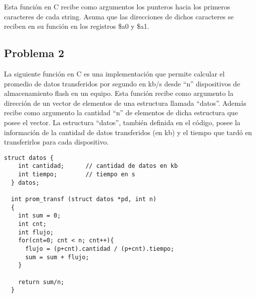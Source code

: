 \documentclass[letterpaper,11pt,notitlepage]{article}
\begin{document}
Esta función en C recibe como argumentos los punteros hacia los primeros caracteres de cada string. Asuma que las direcciones de dichos caracteres se reciben en su función en los registros \$a0 y \$a1.

%

\subsection*{Problema 2}

La siguiente función en C es una implementación que permite calcular el promedio de datos transferidos por segundo en kb/s desde ``n'' dispositivos de almacenamiento flash en un equipo. Esta función recibe como argumento la dirección de un vector de elementos de una estructura llamada ``datos''. Además recibe como argumento la cantidad ``n'' de elementos de dicha estructura que posee el vector. La estructura ``datos'', también definida en el código, posee la información de la cantidad de datos transferidos (en kb) y el tiempo que tardó en transferirlos para cada dispositivo.

\begin{lstlisting}[style=C]
  struct datos {
    int cantidad;      // cantidad de datos en kb
    int tiempo;        // tiempo en s
  } datos;

  int prom_transf (struct datos *pd, int n)
  {
    int sum = 0;
    int cnt;
    int flujo;
    for(cnt=0; cnt < n; cnt++){
      flujo = (p+cnt).cantidad / (p+cnt).tiempo;      
      sum = sum + flujo;
    }

    return sum/n;      
  }
\end{lstlisting}     
\end{document}
